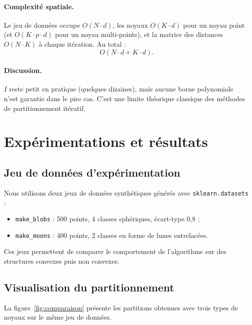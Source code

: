 \documentclass[a4paper, 11pt]{article}
\begin{document}
	\paragraph{Complexité spatiale.}
	Le jeu de données occupe \(O(N \cdot d)\), les noyaux \(O(K \cdot d)\)
	pour un noyau point (et \(O(K \cdot p \cdot d)\) pour un noyau
	multi-points), et la matrice des distances \(O(N \cdot K)\) à chaque
	itération. Au total :
	\[
	O(N \cdot d + K \cdot d).
	\]
	
	\paragraph{Discussion.}
	\(I\) reste petit en pratique (quelques dizaines), mais aucune borne
	polynomiale n'est garantie dans le pire cas. C'est une limite
	théorique classique des méthodes de partitionnement itératif.
	
	\section{Expérimentations et résultats}
	
	\subsection{Jeu de données d'expérimentation}
	
	Nous utilisons deux jeux de données synthétiques générés avec
	\texttt{sklearn.datasets} :
	\begin{itemize}
		\item \texttt{make\_blobs} : 500 points, 4 classes sphériques,
		écart-type 0,8 ;
		\item \texttt{make\_moons} : 400 points, 2 classes en forme de
		lunes entrelacées.
	\end{itemize}
	
	Ces jeux permettent de comparer le comportement de l'algorithme sur
	des structures convexes puis non convexes.
	
	\subsection{Visualisation du partitionnement}
	
	La figure~\ref{fig:comparaison} présente les partitions obtenues avec
	trois types de noyaux sur le même jeu de données.
	
\end{document}
